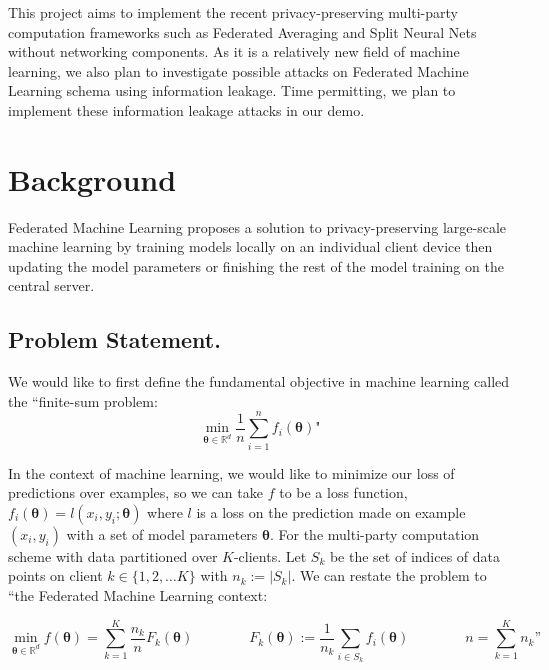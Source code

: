 \documentclass[12pt]{article}
\renewcommand{\vec}[1]{\boldsymbol{\mathbf{#1}}}
\begin{document}
	\noindent This project aims to implement the recent privacy-preserving multi-party computation frameworks such as Federated Averaging and Split Neural Nets without networking components. As it is a relatively new field of machine learning, we also plan to investigate possible attacks on Federated Machine Learning schema using information leakage. Time permitting, we plan to implement these information leakage attacks in our demo.
	
	\section{Background}
	Federated Machine Learning proposes a solution to privacy-preserving large-scale machine learning by training models locally on an individual client device then updating the model parameters or finishing the rest of the model training on the central server.
	
	\vspace{3mm}
	
	\subsection*{Problem Statement.}
	
    \noindent We would like to first define the fundamental objective in machine learning called the ``finite-sum problem:
	$$ \min_{\vec{\theta} \in \mathbb{R}^d} \frac{1}{n} \sum_{i=1}^n f_i(\vec{\theta})\text{"} $$
	
	\noindent In the context of machine learning, we would like to minimize our loss of predictions over examples, so we can take $f$ to be a loss function, $f_i(\vec{\theta}) = l(x_i, y_i; \vec{\theta})$ where $l$ is a loss on the prediction made on example $(x_i, y_i)$ with a set of model parameters $\vec{\theta}$. For the multi-party computation scheme with data partitioned over $K$-clients. Let $S_k$ be the set of indices of data points on client $k \in \{1, 2, \dots K \}$ with $n_k := |S_k|$. We can restate the problem to ``the Federated Machine Learning context:
	
	$$ \min_{\vec{\theta} \in \mathbb{R}^d} f(\vec{\theta}) = \sum_{k=1}^K \frac{n_k}{n} F_k(\vec{\theta}) \qquad \qquad F_k(\vec{\theta}) := \frac{1}{n_k} \sum_{i \in S_k} f_i(\vec{\theta}) \qquad \qquad n = \sum_{k=1}^K n_k \text{''}$$
	
	\vspace{3mm}
	
\end{document}
